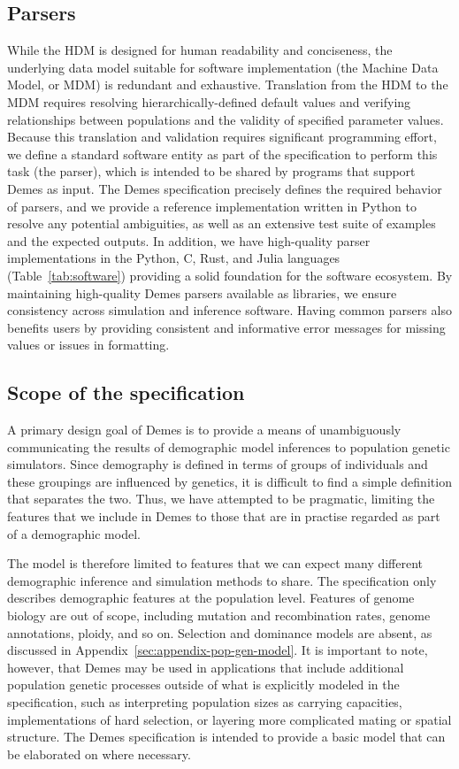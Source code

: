 \documentclass[11pt]{article}
\begin{document}
\subsection*{Parsers}

While the HDM is designed for human readability and
conciseness, the underlying data model suitable for software implementation
(the Machine Data Model, or MDM)
is redundant and exhaustive.
Translation from the HDM to the MDM
requires resolving hierarchically-defined default values and verifying
relationships between populations and the validity of specified parameter
values.
Because this translation and validation requires significant
programming effort, we define a standard software entity as part of the
specification to perform this task (the parser),
which is intended to be shared by programs that support Demes as input.
The Demes specification precisely defines the required behavior of parsers,
and we provide a reference implementation written in Python to resolve any
potential ambiguities, as well as an extensive test suite of examples and the
expected outputs. In addition, we have high-quality parser implementations in
the Python, C, Rust, and Julia languages (Table~\ref{tab:software})
providing a solid foundation for the software ecosystem.
By maintaining high-quality Demes parsers available as libraries,
we ensure consistency across simulation and inference
software.
Having common parsers also benefits users by providing
consistent and informative error messages for missing values or
issues in formatting.

\subsection*{Scope of the specification}

A primary design goal of Demes is to provide a means of
unambiguously communicating the results of demographic
model inferences to population genetic simulators.
Since demography is defined in terms of groups of individuals
and these groupings are influenced by genetics,
it is difficult to find a simple definition that separates
the two. Thus, we have attempted to be pragmatic,
limiting the features that we include in Demes to
those that are in practise regarded as part of a demographic model.

The model is therefore limited to features that we can expect many different
demographic inference and simulation methods to share. The specification only
describes demographic features at the population level. Features of genome
biology are out of scope, including mutation and recombination rates,
genome annotations, ploidy, and so on. Selection and dominance models are
absent, as discussed in Appendix~\ref{sec:appendix-pop-gen-model}.
It is important to note, however, that Demes may be used in applications that
include additional population genetic processes outside of what is explicitly
modeled in the specification, such as interpreting population sizes as
carrying capacities, implementations of hard selection, or layering more
complicated mating or spatial structure. The Demes specification
is intended to provide a basic model that can be elaborated on where necessary.
\end{document}
